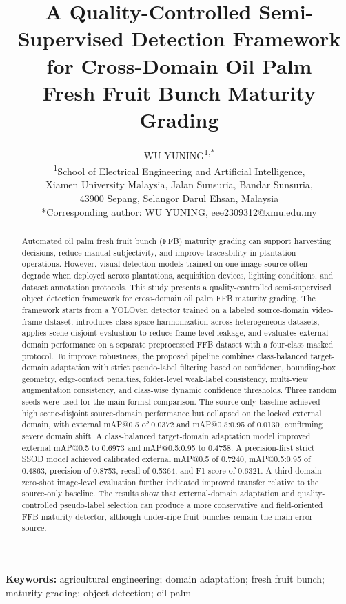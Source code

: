 ﻿\documentclass[12pt]{article}
\title{A Quality-Controlled Semi-Supervised Detection Framework\\for Cross-Domain Oil Palm\\Fresh Fruit Bunch Maturity Grading}
\author{
WU YUNING\textsuperscript{1,*}\\
\textsuperscript{1}School of Electrical Engineering and Artificial Intelligence,\\
Xiamen University Malaysia, Jalan Sunsuria, Bandar Sunsuria,\\
43900 Sepang, Selangor Darul Ehsan, Malaysia\\
*Corresponding author: WU YUNING, eee2309312@xmu.edu.my
}
\date{}
\begin{document}
\setlength{\emergencystretch}{3em}
\sloppy
\maketitle
\linenumbers

\begin{abstract}
Automated oil palm fresh fruit bunch (FFB) maturity grading can support harvesting decisions, reduce manual subjectivity, and improve traceability in plantation operations. However, visual detection models trained on one image source often degrade when deployed across plantations, acquisition devices, lighting conditions, and dataset annotation protocols. This study presents a quality-controlled semi-supervised object detection framework for cross-domain oil palm FFB maturity grading. The framework starts from a YOLOv8n detector trained on a labeled source-domain video-frame dataset, introduces class-space harmonization across heterogeneous datasets, applies scene-disjoint evaluation to reduce frame-level leakage, and evaluates external-domain performance on a separate preprocessed FFB dataset with a four-class masked protocol. To improve robustness, the proposed pipeline combines class-balanced target-domain adaptation with strict pseudo-label filtering based on confidence, bounding-box geometry, edge-contact penalties, folder-level weak-label consistency, multi-view augmentation consistency, and class-wise dynamic confidence thresholds. Three random seeds were used for the main formal comparison. The source-only baseline achieved high scene-disjoint source-domain performance but collapsed on the locked external domain, with external mAP@0.5 of 0.0372 and mAP@0.5:0.95 of 0.0130, confirming severe domain shift. A class-balanced target-domain adaptation model improved external mAP@0.5 to 0.6973 and mAP@0.5:0.95 to 0.4758. A precision-first strict SSOD model achieved calibrated external mAP@0.5 of 0.7240, mAP@0.5:0.95 of 0.4863, precision of 0.8753, recall of 0.5364, and F1-score of 0.6321. A third-domain zero-shot image-level evaluation further indicated improved transfer relative to the source-only baseline. The results show that external-domain adaptation and quality-controlled pseudo-label selection can produce a more conservative and field-oriented FFB maturity detector, although under-ripe fruit bunches remain the main error source.
\end{abstract}

\textbf{Keywords:} agricultural engineering; domain adaptation; fresh fruit bunch; maturity grading; object detection; oil palm
\end{document}
